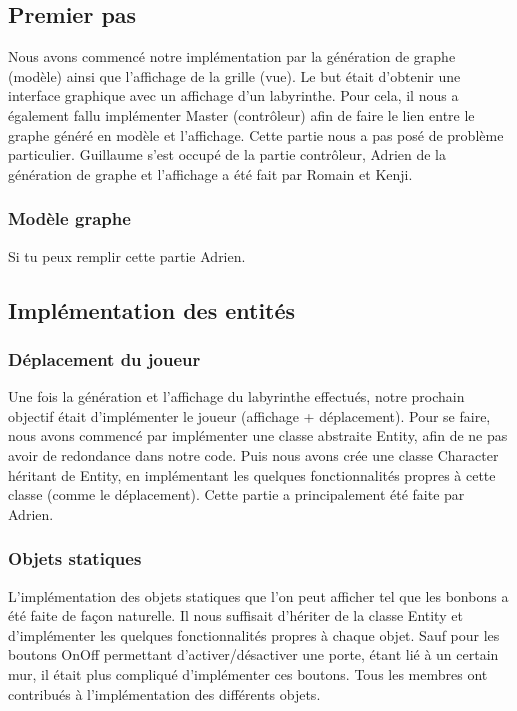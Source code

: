 \documentclass[a4paper]{article}
\begin{document}
\subsection{Premier pas}
Nous avons commencé notre implémentation par la génération de graphe (modèle)
ainsi que l'affichage de la grille (vue). Le but était d'obtenir une interface
graphique avec un affichage d'un labyrinthe. Pour cela, il nous a également
fallu implémenter Master (contrôleur) afin de faire le lien entre le graphe
généré en modèle et l'affichage. Cette partie nous a pas posé de
problème particulier. Guillaume s'est occupé de la partie contrôleur, Adrien
de la génération de graphe et l'affichage a été fait par Romain et Kenji.

\subsubsection{Modèle graphe}

Si tu peux remplir cette partie Adrien.

\subsection{Implémentation des entités}

\subsubsection{Déplacement du joueur}
Une fois la génération et l'affichage du labyrinthe effectués, notre prochain
objectif était d'implémenter le joueur (affichage + déplacement).
Pour se faire, nous avons commencé par implémenter une classe abstraite Entity,
afin de ne pas avoir de redondance dans notre code.
Puis nous avons crée une classe Character héritant de Entity, en implémentant
les quelques fonctionnalités propres à cette classe (comme le déplacement).
Cette partie a principalement été faite par Adrien.

\subsubsection{Objets statiques}
L'implémentation des objets statiques que l'on peut afficher tel que les
bonbons a été faite de façon naturelle. Il nous suffisait d'hériter de la
classe Entity et d'implémenter les quelques fonctionnalités propres à chaque
objet. Sauf pour les boutons OnOff permettant d'activer/désactiver une porte,
étant lié à un certain mur, il était plus compliqué d'implémenter ces boutons.
Tous les membres ont contribués à l'implémentation des différents objets.
\end{document}
